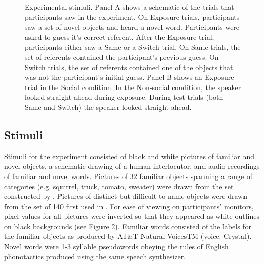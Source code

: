 \documentclass[man]{apa2}
\begin{document}
%
\begin{figure} [H]
	\centering
	\caption{Experimental stimuli. Panel A shows a schematic of the trials that participants saw in the experiment. On Exposure trials, participants saw a set of novel objects and heard a novel word. Participants were asked to guess it's correct referent. After the Exposure trial, participants either saw a Same or a Switch trial. On Same trials, the set of referents contained the participant's previous guess. On Switch trials, the set of referents contained one of the objects that was not the participant's initial guess. Panel B shows an Exposure trial in the Social condition. In the Non-social condition, the speaker looked straight ahead during exposure. During test trials (both Same and Switch) the speaker looked straight ahead.}
\end{figure}
%

\subsection{Stimuli}

Stimuli for the experiment consisted of black and white pictures of familiar
and novel objects, a schematic drawing of a human interlocutor, and audio recordings of familiar and novel words. Pictures of 32 familiar objects spanning a range of categories (e.g. squirrel, truck, tomato, sweater) were drawn from the set constructed by . Pictures of distinct but
difficult to name objects were drawn from the set of 140 first used in . For ease of viewing on participants' monitors, pixel values for all pictures were inverted so that they appeared as white outlines on black backgrounds (see Figure 2). Familiar words consisted of the labels for the familiar objects as produced by AT&T Natural VoicesTM (voice: Crystal). Novel words were 1-3 syllable pseudowords obeying the rules of English phonotactics produced using the same speech synthesizer.
\end{document}
